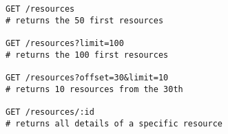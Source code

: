 \label{appendix:REST}


\begin{lstlisting}[language=restinterface]
GET /resources
# returns the 50 first resources

GET /resources?limit=100
# returns the 100 first resources

GET /resources?offset=30&limit=10
# returns 10 resources from the 30th

GET /resources/:id
# returns all details of a specific resource

\end{lstlisting}